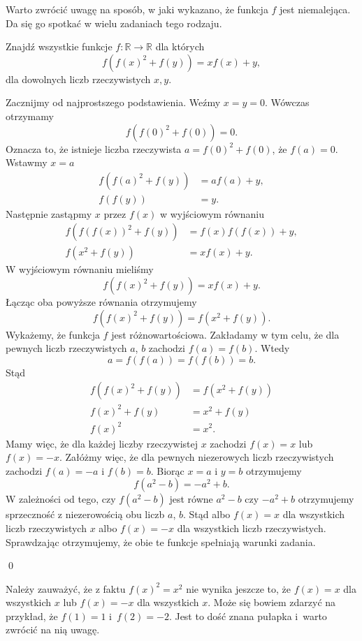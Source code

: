 \vspace{10px}
\noindent 
Warto zwrócić uwagę na sposób, w jaki wykazano, że funkcja $f$ jest niemalejąca. Da się go spotkać w wielu zadaniach tego rodzaju. 

\vspace{10px}


\noindent
Znajdź wszystkie funkcje $ f:\mathbb{R}\to\mathbb{R} $ dla których 
\[
	f(f(x)^2 + f(y)) = xf(x) + y,
\]
dla dowolnych liczb rzeczywistych $x, y$.


\noindent
Zacznijmy od najprostszego podstawienia. Weźmy $x = y = 0$. Wówczas otrzymamy
\[
	f(f(0)^2 + f(0)) = 0.
\]
Oznacza to, że istnieje  liczba rzeczywista $a = f(0)^2 + f(0)$, że $f(a) = 0$. Wstawmy $x = a$
\begin{align*}
	f(f(a)^2 + f(y)) &= af(a) + y, \\
	f(f(y)) &= y.
\end{align*}
Następnie zastąpmy $x$ przez $f(x)$ w wyjściowym równaniu
\begin{align*}
	f(f(f(x))^2 + f(y)) &= f(x)f(f(x)) + y, \\
	f(x^2 + f(y)) &= xf(x) + y.
\end{align*}
W wyjściowym równaniu mieliśmy
\[
	f(f(x)^2 + f(y)) = xf(x) + y.
\]
Łącząc oba powyższe równania otrzymujemy
\[
	f(f(x)^2 + f(y)) = f(x^2 + f(y)).
\]
Wykażemy, że funkcja $f$ jest różnowartościowa. Zakładamy w tym celu, że dla pewnych liczb rzeczywistych $a$, $b$ zachodzi $f(a) = f(b)$. Wtedy
\[
	a = f(f(a)) = f(f(b)) = b.
\]
Stąd
\begin{align*}
	f(f(x)^2 + f(y)) &= f(x^2 + f(y)) \\
	f(x)^2 + f(y) &= x^2 + f(y) \\
	f(x)^2 &= x^2.
\end{align*}
Mamy więc, że dla każdej liczby rzeczywistej $x$ zachodzi $f(x) = x$ lub $f(x) = -x$. Załóżmy więc, że dla pewnych niezerowych liczb rzeczywistych zachodzi $f(a) = -a$ i $f(b) = b$. Biorąc $x = a$ i $y = b$ otrzymujemy
\[
	f(a^2 - b) = -a^2 + b.
\]
W zależności od tego, czy $f(a^2 - b)$ jest równe $a^2 - b$ czy $-a^2 + b$ otrzymujemy sprzeczność z niezerowością obu liczb $a$, $b$. Stąd albo $f(x) = x$ dla wszystkich liczb rzeczywistych $x$ albo $f(x) = -x$ dla wszystkich liczb rzeczywistych. Sprawdzając otrzymujemy, że obie te funkcje spełniają warunki zadania.

\qed

\vspace{10px}
\noindent
Należy zauważyć, że z faktu $f(x)^2 = x^2$ nie wynika jeszcze to, że $f(x) = x$ dla wszystkich $x$ lub $f(x) = -x$ dla wszystkich $x$. Może się bowiem zdarzyć na przykład, że $f(1) = 1$ i~$f(2) = -2$. Jest to dość znana pułapka i~warto zwrócić na nią uwagę.
